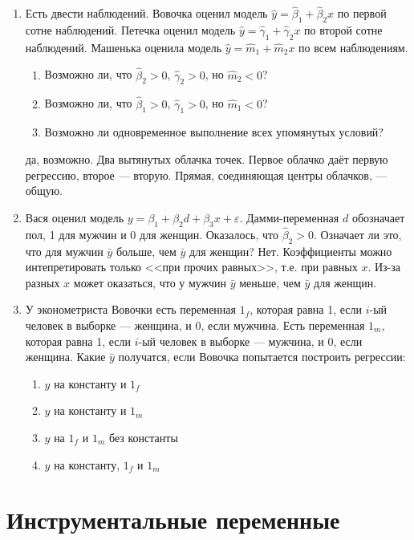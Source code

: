 \documentclass[pdftex,12pt,a4paper]{article}
\def \hb{\hat{\beta}}
\def \hy{\hat{y}}
\newcommand{\solution}[1]{ {\tiny #1} }
\begin{document}
\begin{enumerate}
\item Есть двести наблюдений. Вовочка оценил модель $\hy=\hb_1+\hb_2 x$ по первой сотне наблюдений. Петечка оценил модель $\hy=\hat{\gamma}_1+\hat{\gamma}_2 x$ по второй сотне наблюдений. Машенька оценила модель $\hy=\hat{m}_1+\hat{m}_2 x$ по всем наблюдениям.
\begin{enumerate}
\item Возможно ли, что $\hb_2>0$, $\hat{\gamma}_2>0$, но $\hat{m}_2<0$?
\item Возможно ли, что $\hb_1>0$, $\hat{\gamma}_1>0$, но $\hat{m}_1<0$?
\item Возможно ли одновременное выполнение всех упомянутых условий?
\end{enumerate}
\solution{да, возможно. Два вытянутых облачка точек. Первое облачко даёт первую регрессию, второе --- вторую. Прямая, соединяющая центры облачков, --- общую.}



\item Вася оценил модель $y=\beta_1+\beta_2 d+\beta_3 x+\varepsilon$. Дамми-переменная $d$ обозначает пол, 1 для мужчин и 0 для женщин. Оказалось, что $\hat{\beta}_2>0$. Означает ли это, что для мужчин $\bar{y}$ больше, чем $\bar{y}$ для женщин?
\solution{Нет. Коэффициенты можно интепретировать только <<при прочих равных>>, т.е. при равных $x$. Из-за разных $x$ может оказаться, что у мужчин $\bar{y}$ меньше, чем $\bar{y}$ для женщин.}

\item У эконометриста Вовочки есть переменная $1_f$, которая равна 1, если $i$-ый человек в выборке --- женщина, и 0, если мужчина. Есть переменная $1_m$, которая равна 1, если $i$-ый человек в выборке --- мужчина, и 0, если женщина. Какие $\hy$ получатся, если Вовочка попытается построить регрессии:
\begin{enumerate}
\item $y$ на константу и $1_f$
\item $y$ на константу и $1_m$
\item $y$ на $1_f$ и $1_m$ без константы
\item $y$ на константу, $1_f$ и $1_m$
\end{enumerate}


\end{enumerate}

\section{Инструментальные переменные}
\end{document}
